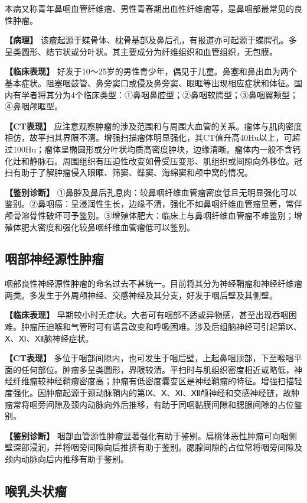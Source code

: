 本病又称青年鼻咽血管纤维瘤、男性青春期出血性纤维瘤等，是鼻咽部最常见的良性肿瘤。

\textbf{【病理】}
该瘤起源于蝶骨体、枕骨基部及鼻后孔，有报道亦可起源于蝶腭孔。多呈类圆形、结节状或分叶状。其主要成分为纤维组织和血管组织，无包膜。

\textbf{【临床表现】}
好发于10～25岁的男性青少年，偶见于儿童。鼻塞和鼻出血为两个基本症状。阻塞咽鼓管、鼻旁窦口或侵及鼻旁窦、眼眶等出现相应症状和体征。国内有学者将其分为4个临床类型：①鼻咽鼻腔型；②鼻咽软腭型；③鼻咽翼颊型；④鼻咽颅眶型。

\textbf{【CT表现】}
应注意观察肿瘤的涉及范围和与周围大血管的关系。瘤体与肌肉密度相仿，故平扫其界限不清。增强扫描瘤体明显强化，其CT值升高40Hu以上，可超过100Hu；瘤体呈椭圆形或分叶状均质高密度肿块，边缘清晰。瘤体内一般不含钙化灶和静脉石。周围组织有压迫性改变如骨受压变形、肌组织或间隙向外移位。冠扫有助于了解肿瘤侵入眼眶、筛窦、蝶窦、海绵窦和颅中窝的情况。

\textbf{【鉴别诊断】}
①鼻腔及鼻后孔息肉：较鼻咽纤维血管瘤密度低且无明显强化可以鉴别。②鼻咽癌：呈浸润性生长，边缘不清，强化不如鼻咽纤维血管瘤显著，常伴颅骨溶骨性破坏可予鉴别。③增殖体肥大：临床上与鼻咽纤维血管瘤不难鉴别；增殖体肥大密度和强化较鼻咽纤维血管瘤低可以鉴别。

\subsection{咽部神经源性肿瘤}

咽部良性神经源性肿瘤的命名过去不甚统一。目前将其分为神经鞘瘤和神经纤维瘤两类。多发生于外周颅神经、交感神经及其分支，好发于咽后壁及其侧壁。

\textbf{【临床表现】}
早期较小时无症状。大者可有咽部不适或异物感，甚至出现吞咽困难。肿瘤压迫喉和气管时可有语言改变和呼吸困难。涉及后组脑神经可引起第Ⅸ、Ⅹ、Ⅺ、Ⅻ脑神经症状。

\textbf{【CT表现】}
多位于咽部间隙内，也可发生于咽后壁，上起鼻咽顶部，下至喉咽平面的任何部位。肿瘤多呈类圆形，界限较清。平扫时与肌组织密度相近或略低，神经纤维瘤较神经鞘瘤密度高；肿瘤有低密度囊变区是神经鞘瘤的特征。增强扫描轻度强化。因肿瘤起源于颈动脉鞘内的第Ⅸ、Ⅹ、Ⅺ、Ⅻ颅神经和交感神经链，故肿瘤常将咽旁间隙及颈内动脉向外后推移，有助于同咽黏膜间隙和腮腺间隙的占位鉴别。

\textbf{【鉴别诊断】}
咽部血管源性肿瘤显著强化有助于鉴别。扁桃体恶性肿瘤可向咽侧壁深部浸润，并将咽旁间隙向后推挤有助于鉴别。腮腺间隙的占位常将咽旁间隙及颈内动脉向后内推移有助于鉴别。

\subsection{喉乳头状瘤}

